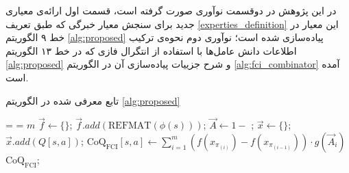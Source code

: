 در این پژوهش در دوقسمت نوآوری صورت گرفته است، قسمت اول ارائه‌ی معیاری جدید برای سنجش معیار خبرگی که طبق تعریف
\ref{experties_definition}
این معیار در خط ۹ الگوریتم
\ref{alg:proposed}
پیاده‌سازی شده است؛ نوآوری دوم نحوه‌ی ترکیب اطلاعات دانش عامل‌ها با استفاده از انتگرال فازی که در خط ۱۳ الگوریتم
\ref{alg:proposed}
و شرح جزییات پیاده‌سازی آن در الگوریتم
\ref{alg:fci_combinator}
آمده است.

\begin{algorithm}[t]
\caption{تابع  معرفی شده در الگوریتم \ref{alg:proposed}}\label{alg:fci_combinator}
\begin{latin}
\begin{algorithmic}[1]
\Require {} =  = $m$
	 \label{alg:fci_combinator:line:foreach:state}
		\State $\vec{f} \gets \{\}$; 
		\label{alg:fci_combinator:line:refmat:foreach}
			\State $\vec{f}.add(\text{REFMAT}(\phi(s)))$;\label{alg:fci_combinator:line:refmat:foreach:loop}
		\EndFor
		\State $\vec{A} \gets 1 - $ ; \label{alg:fci_combinator:line:normalize}
		 \label{alg:fci_combinator:line:fci:foreach:state_action}
			\State $\vec{x} \gets \{\}$; 
			 \label{alg:fci_combinator:line:fci:foreach:state_action:x}
				\State $\vec{x}.add(Q[s, a])$;\label{alg:fci_combinator:line:fci:foreach:state_action:x:loop}
			\EndFor
			\State $\text{CoQ}_{\text{FCI}}[s, a] \gets \sum_{i = 1}^{m} \left( f(x_{\pi_{(i)}}) - f(x_{\pi_{(i-1)}}) \right) \cdot g(\vec{A}_i)$  \label{alg:fci_combinator:line:fci}
		\EndFor
	\EndFor
\State \Return $\text{CoQ}_{\text{FCI}}$;
\EndProcedure
\end{algorithmic}
\end{latin}
\end{algorithm}

